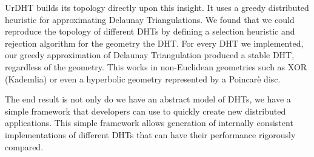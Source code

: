 UrDHT builds its topology directly upon this insight.
It uses a greedy distributed heuristic for approximating Delaunay Triangulations.
We found that we could reproduce the topology of different DHTs by defining a selection heuristic and rejection algorithm for the geometry the DHT.
For every DHT we implemented, our greedy approximation of Delaunay Triangulation produced a stable DHT, regardless of the geometry.  
This works in non-Euclidean geometries such as XOR (Kademlia) or even a hyperbolic geometry represented by a Poincar\`{e} disc.

The end result is not only do we have an abstract model of DHTs, we have a simple framework that developers can use to quickly create new distributed applications.
This simple framework allows generation of internally consistent implementations of different DHTs that can have their performance rigorously compared.  %



%
%

